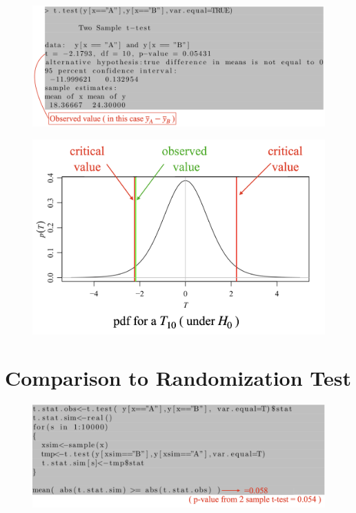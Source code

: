 \documentclass[14pt]{extarticle}
\begin{document}
\begin{figure}[H]
    \centering
    \includegraphics[width=1\textwidth]{fig15.png}
\end{figure}

\begin{figure}[H]
    \centering
    \includegraphics[width=1\textwidth]{fig16.png}
\end{figure}

\newpage

\section*{Comparison to Randomization Test} 

\begin{figure}[H]
    \centering
    \includegraphics[width=1\textwidth]{fig17.png}
\end{figure}
\end{document}

